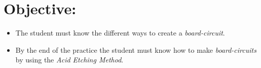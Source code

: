 \section{Objective:}

\begin{itemize}
\item The student must know the different ways to create a {\itshape board-circuit}.
\item By the end of the practice the student must know how to make {\itshape board-circuits} by using the {\itshape Acid Etching Method}. 
\end{itemize}